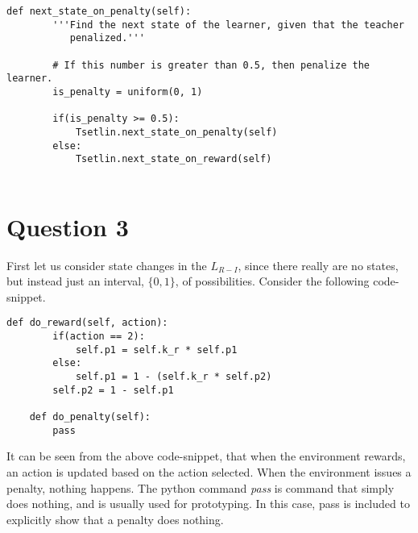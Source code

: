 \documentclass[10pt,english]{article}
\begin{document}
\clearpage
\begin{lstlisting}[label={list:first},caption=Krylov core code.] 
def next_state_on_penalty(self):
        '''Find the next state of the learner, given that the teacher
           penalized.'''

        # If this number is greater than 0.5, then penalize the learner.
        is_penalty = uniform(0, 1)

        if(is_penalty >= 0.5):
            Tsetlin.next_state_on_penalty(self)
        else:
            Tsetlin.next_state_on_reward(self)
   
\end{lstlisting}

\section{Question 3} 

First let us consider state changes in the $L_{R-I}$, since there really are no states, but instead just an interval, $\lbrace0, 1\rbrace$, of possibilities.  Consider the following code-snippet.

\begin{lstlisting}[label={list:first},caption=State Translation in the $L_{R-I}$  automaton.] 
 def do_reward(self, action):
        if(action == 2):
            self.p1 = self.k_r * self.p1
        else:
            self.p1 = 1 - (self.k_r * self.p2)
        self.p2 = 1 - self.p1

    def do_penalty(self):
        pass  
\end{lstlisting}
It can be seen from the above code-snippet, that when the environment rewards, an action is updated based on the action selected.  When the environment issues a penalty, nothing happens.  The python command \textit{pass} is command that simply does nothing, and is usually used for prototyping.  In this case, pass is included to explicitly show that a penalty does nothing.
\end{document}
